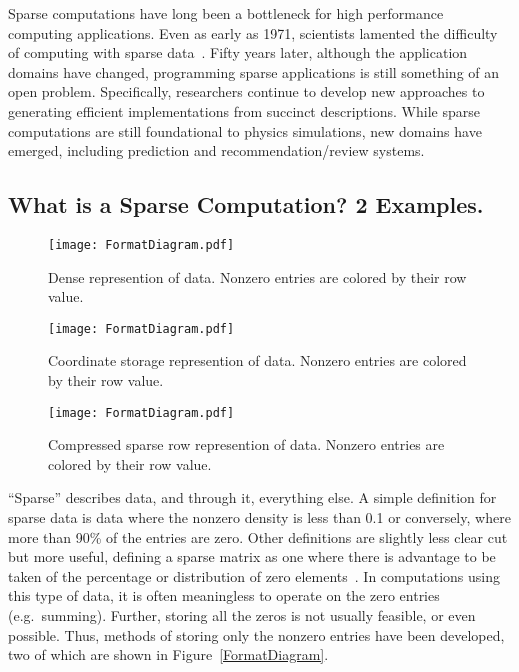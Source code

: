 Sparse computations have long been a bottleneck for high performance computing applications. 
Even as early as 1971, scientists lamented the difficulty of computing with sparse data~\cite{willoughby1971sparse}.
Fifty years later, although the application domains have changed, programming sparse applications is still something of an open problem.
Specifically, researchers continue to develop new approaches to generating efficient implementations from succinct descriptions.
While sparse computations are still foundational to physics simulations, new domains have emerged, including prediction and recommendation/review systems.

\subsection{What is a Sparse Computation? 2 Examples.}

\begin{figure*}
  \centering
  \begin{subfigure}{0.45\textwidth}
    \texttt{[image: FormatDiagram.pdf]}
    \caption{Dense represention of data. Nonzero entries are colored by their row value.}\label{FormatDiagram:Dense}
  \end{subfigure}
  \begin{subfigure}{0.45\textwidth}
    \texttt{[image: FormatDiagram.pdf]}
    \caption{Coordinate storage represention of data. Nonzero entries are colored by their row value.}\label{FormatDiagram:COO}
  \end{subfigure}

  \begin{subfigure}[c]{0.45\textwidth}
    \texttt{[image: FormatDiagram.pdf]}
    \caption{Compressed sparse row represention of data. Nonzero entries are colored by their row value.}\label{FormatDiagram:CSR}
  \end{subfigure}
\caption{Dense, COO, and CSR storage representations of the same data.}\label{FormatDiagram}
\end{figure*}
``Sparse'' describes data, and through it, everything else.
A simple definition for sparse data is data where the nonzero density is less than 0.1 or conversely, where more than 90\% of the entries are zero.
Other definitions are slightly less clear cut but more useful, defining a sparse matrix as one where there is advantage to be taken of the percentage or distribution of zero elements~\cite{duff1977survey}.
In computations using this type of data, it is often meaningless to operate on the zero entries (e.g.\ summing).
Further, storing all the zeros is not usually feasible, or even possible.
Thus, methods of storing only the nonzero entries have been developed, two of which are shown in Figure~\ref{FormatDiagram}.

